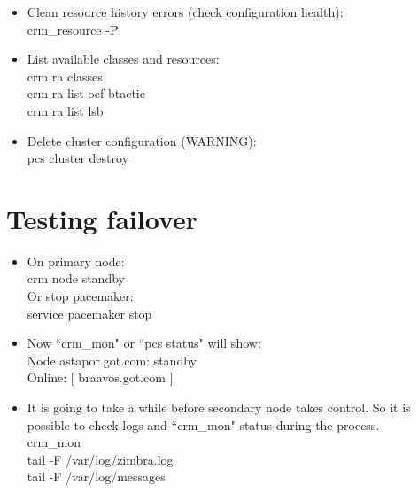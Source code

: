 \documentclass[a4paper, 12pt]{book}
\begin{document}
\begin{itemize}
	\item Clean resource history errors (check configuration health):\\
		crm\_resource -P
\end{itemize}

\begin{itemize}
	\item List available classes and resources:\\
		crm ra classes\\
		crm ra list ocf btactic\\
		crm ra list lsb
\end{itemize}

\begin{itemize}
	\item Delete cluster configuration (WARNING):\\
		pcs cluster destroy
\end{itemize}

\section{Testing failover}
\label{sec:failover}


\begin{itemize}
	\item On primary node:\\
		crm node standby\\
	Or stop pacemaker:\\
		service pacemaker stop
\end{itemize}


\begin{itemize}
	\item Now ``crm\_mon" or ``pcs status" will show:\\
		Node astapor.got.com: standby\\
		Online: [ braavos.got.com ]
\end{itemize}


\begin{itemize}
	\item It is going to take a while before secondary node takes control. So it is possible to check logs and ``crm\_mon" status during the process.\\
		crm\_mon\\
		tail -F /var/log/zimbra.log\\
		tail -F /var/log/messages
\end{itemize}
\end{document}
